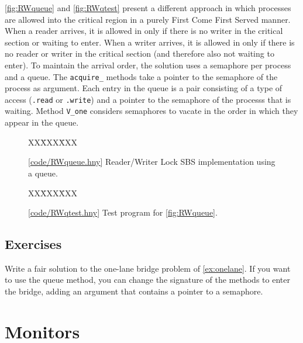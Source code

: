 \documentclass{report}
\newcommand{\harmonysource}[1]{
\begin{tabbing}
XX\=XXX\=XXX\kill
    
\end{tabbing}
}
\newcommand{\harmonylink}[1]{%
[\href{https://www.cs.cornell.edu/home/rvr/harmony/#1}{\underline{#1}}]%
}
\newenvironment{code}{
\tcolorbox
}{
\endtcolorbox
}
\begin{document}
\autoref{fig:RWqueue} and \autoref{fig:RWqtest} present a different approach
in which processes are allowed into the critical region in a purely First
Come First Served manner.  When a reader arrives, it is allowed in only if
there is no writer in the critical section or waiting to enter.  When a writer
arrives, it is allowed in only if there is no reader or writer in the
critical section (and therefore also not waiting to enter).  To maintain the
arrival order, the solution uses a semaphore per process and a queue.
The \texttt{acquire\_} methods take a pointer to
the semaphore of the process as argument.
Each entry in the queue is a pair consisting of a type of access
(\texttt{.read} or \texttt{.write}) and a pointer to the semaphore of the
processs that is waiting.  Method \texttt{V\_one} considers semaphores to vacate
in the order in which they appear in the queue.

\begin{figure}
\begin{code}
{\small
\harmonysource{RWqueue}
}
\end{code}
\caption{\harmonylink{code/RWqueue.hny} Reader/Writer Lock SBS implementation using a queue.}
\label{fig:RWqueue}
\end{figure}

\begin{figure}
\begin{code}
\harmonysource{RWqtest}
\end{code}
\caption{\harmonylink{code/RWqtest.hny} Test program for \autoref{fig:RWqueue}.}
\label{fig:RWqtest}
\end{figure}

\section*{Exercises}
\begin{problems}
\item Write a fair solution to the one-lane bridge problem of
\autoref{ex:onelane}.
If you want to use the queue method, you can change the signature of the
methods to enter the bridge, adding an argument that contains a pointer to a
semaphore.
\end{problems}

\chapter{Monitors}
\label{ch:monitors}

%
%
\end{document}
